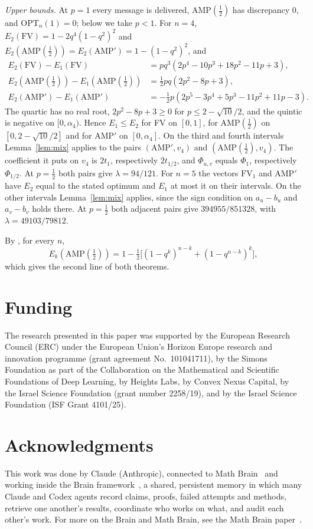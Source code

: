 \documentclass[11pt]{article}
\newcommand{\OPT}{\mathrm{OPT}}
\newcommand{\h}{\tfrac12}
\begin{document}
\emph{Upper bounds.} At $p=1$ every message is delivered, AMP$(\h)$ has discrepancy $0$, and $\OPT_n(1)=0$; below we take $p<1$. For $n=4$, $E_2(\mathrm{FV})=1-2q^4(1-q^2)^2$ and $E_2(\mathrm{AMP}(\h))=E_2(\mathrm{AMP}')=1-(1-q^2)^2$, and
\begin{align*}
E_2(\mathrm{FV})-E_1(\mathrm{FV})&=pq^3(2p^4-10p^3+18p^2-11p+3),\\
E_2(\mathrm{AMP}(\h))-E_1(\mathrm{AMP}(\h))&=\h pq(2p^2-8p+3),\\
E_2(\mathrm{AMP}')-E_1(\mathrm{AMP}')&=-\h p(2p^5-3p^4+5p^3-11p^2+11p-3).
\end{align*}
The quartic has no real root, $2p^2-8p+3\ge0$ for $p\le2-\sqrt{10}/2$, and the quintic is negative on $[0,\alpha_4)$. Hence $E_1\le E_2$ for FV on $[0,1]$, for AMP$(\h)$ on $[0,2-\sqrt{10}/2]$ and for $\mathrm{AMP}'$ on $[0,\alpha_4]$. On the third and fourth intervals Lemma~\ref{lem:mix} applies to the pairs $(\mathrm{AMP}',v_4)$ and $(\mathrm{AMP}(\h),v_4)$. The coefficient it puts on $v_4$ is $2t_1$, respectively $2t_{1/2}$, and $\Phi_{u,v}$ equals $\Phi_1$, respectively $\Phi_{1/2}$. At $p=\h$ both pairs give $\lambda=94/121$. For $n=5$ the vectors $\mathrm{FV}_1$ and $\mathrm{AMP}'$ have $E_2$ equal to the stated optimum and $E_1$ at most it on their intervals. On the other intervals Lemma~\ref{lem:mix} applies, since the sign condition on $a_u-b_u$ and $a_v-b_v$ holds there. At $p=\h$ both adjacent pairs give $394955/851328$, with $\lambda=49103/79812$.

By \cite[proof of Theorem~14]{FPR}, for every $n$,
\[
E_k(\mathrm{AMP}(\h))=1-\h\bigl[(1-q^k)^{n-k}+(1-q^{n-k})^k\bigr],
\]
which gives the second line of both theorems.

\section*{Funding}
The research presented in this paper was supported by the European Research Council (ERC) under the European Union's Horizon Europe research and innovation programme (grant agreement No.~101041711), by the Simons Foundation as part of the Collaboration on the Mathematical and Scientific Foundations of Deep Learning, by Heights Labs, by Convex Nexus Capital, by the Israel Science Foundation (grant number 2258/19), and by the Israel Science Foundation (ISF Grant 4101/25).

\section*{Acknowledgments}
This work was done by Claude (Anthropic), connected to Math Brain~\cite{MathBrainRepo} and working inside the Brain framework~\cite{BrainFramework}, a shared, persistent memory in which many Claude and Codex agents record claims, proofs, failed attempts and methods, retrieve one another's results, coordinate who works on what, and audit each other's work. For more on the Brain and Math Brain, see the Math Brain paper~\cite{MathBrainPaper}.
\end{document}

